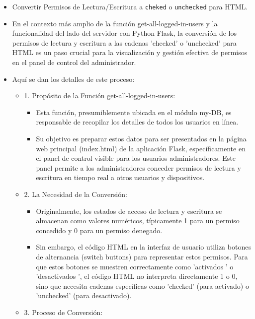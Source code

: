 \documentclass{report}
\begin{document}
\begin{itemize}
    \item Convertir Permisos de Lectura/Escritura a \texttt{cheked} o \texttt{unchecked} para HTML.
    \item En el contexto más amplio de la función get-all-logged-in-users y la funcionalidad del lado del servidor con Python Flask, la conversión de los 
    permisos de lectura y escritura a las cadenas 'checked' o 'unchecked' para HTML es un paso crucial para la visualización y gestión efectiva de permisos 
    en el panel de control del administrador.
    \item Aquí se dan los detalles de este proceso:
    \begin{itemize}
        \item 1. Propósito de la Función get-all-logged-in-users:
            \begin{itemize}
                \item Esta función, presumiblemente ubicada en el módulo my-DB, es responsable de recopilar los detalles de todos los usuarios en línea.
                \item Su objetivo es preparar estos datos para ser presentados en la página web principal (index.html) de la aplicación Flask, 
                específicamente en el panel de control visible para los usuarios administradores. Este panel permite a los administradores conceder 
                permisos de lectura y escritura en tiempo real a otros usuarios y dispositivos.
            \end{itemize}
        \item 2. La Necesidad de la Conversión:
            \begin{itemize}
                \item Originalmente, los estados de acceso de lectura y escritura se almacenan como valores numéricos, típicamente 1 para un permiso concedido 
                y 0 para un permiso denegado.
                \item Sin embargo, el código HTML en la interfaz de usuario utiliza botones de alternancia (switch buttons) para representar estos permisos. 
                Para que estos botones se muestren correctamente como  'activados ' o  'desactivados ', el código HTML no interpreta directamente 1 o 0, 
                sino que necesita cadenas específicas como 'checked' (para activado) o 'unchecked' (para desactivado).
            \end{itemize}
        \item 3. Proceso de Conversión:
            \begin{itemize}

\end{itemize}
\end{itemize}
\end{itemize}
\end{document}
